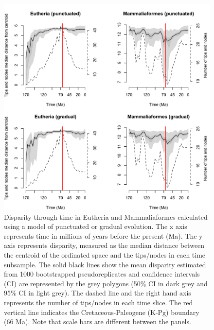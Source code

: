 \documentclass[12pt,letterpaper]{article}
\begin{document}
\begin{figure}[!htbp]
\centering
    \includegraphics[keepaspectratio=true]{Figures/Main_results.pdf}
\caption{Disparity through time in Eutheria and Mammaliaformes calculated using a model of punctuated or gradual evolution. The x axis represents time in millions of years before the present (Ma). The y axis represents disparity, measured as the median distance between the centroid of the ordinated space and the tips/nodes in each time subsample. The solid black lines show the mean disparity estimated from 1000 bootstrapped pseudoreplicates and confidence intervals (CI) are represented by the grey polygons (50\% CI in dark grey and 95\% CI in light grey). The dashed line and the right hand axis represents the number of tips/nodes in each time slice. The red vertical line indicates the Cretaceous-Paleogene (K-Pg) boundary (66 Ma). Note that scale bars are different between the panels.}
\label{fig:Fig_Raw_results}
\end{figure}
\end{document}
